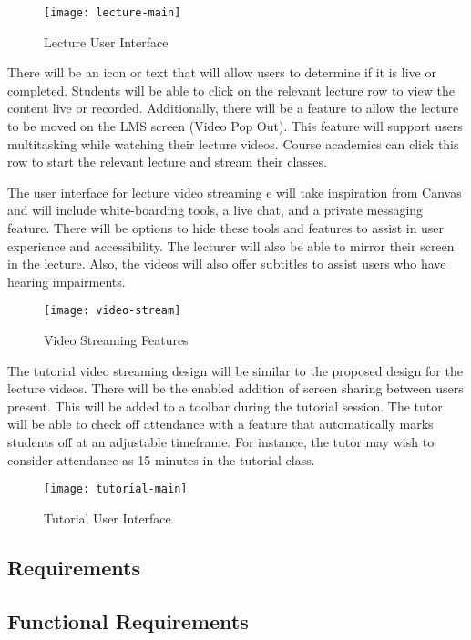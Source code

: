 \begin{figure}[h!]
    \centering
    \texttt{[image: lecture-main]}
    \caption{Lecture User Interface}
\end{figure}

There will be an icon or text that will allow users to determine if it is live or completed. Students will be able to click on the relevant lecture row to view the 
content live or recorded. Additionally, there will be a feature to allow the lecture to be moved on the LMS screen (Video Pop Out). This feature will support users 
multitasking while watching their lecture videos. Course academics can click this row to start the relevant lecture and stream their classes. 

The user interface for lecture video streaming e will take inspiration from Canvas and will include white-boarding tools, a live chat, and a private messaging feature. There will be 
options to hide these tools and features to assist in user experience and accessibility. The lecturer will also be able to mirror their screen in the lecture. Also, the 
videos will also offer subtitles to assist users who have hearing impairments. 

\begin{figure}[h!]
  \centering
  \texttt{[image: video-stream]}
  \caption{Video Streaming Features}
\end{figure}

\newpage
The tutorial video streaming design will be similar to the proposed design for the lecture videos. There will be the enabled addition of screen sharing between users present. 
This will be added to a toolbar during the tutorial session. The tutor will be able to check off attendance with a feature that automatically marks students 
off at an adjustable timeframe. For instance, the tutor may wish to consider attendance as 15 minutes in the tutorial class. 

\begin{figure}[h!]
    \centering
    \texttt{[image: tutorial-main]}
    \caption{Tutorial User Interface}
\end{figure}
\newpage

\subsection{Requirements}
\subsection{Functional Requirements}


